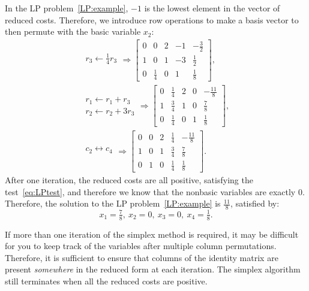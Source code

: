 \begin{example}
In the LP problem~\eqref{LP:example}, $-1$ is the lowest element in the vector of reduced costs. Therefore, we introduce row operations to make a basis vector to then permute with the basic variable $x_2$:
\begin{align*}
\begin{array}{c} r_3\leftarrow \tfrac{1}{4}r_3\\\end{array} \Rightarrow \left[\begin{array}{cccc|c} 0 & 0 & 2 & -1 & -\tfrac{3}{2}\\\hline 1 & 0 & 1 & -3 & \tfrac{1}{2}\\ 0 & \tfrac{1}{4} & 0 & 1 & \tfrac{1}{8}\end{array}\right],\\
\begin{array}{c} r_1\leftarrow r_1+r_3\\r_2\leftarrow r_2+3r_3\end{array} \Rightarrow \left[\begin{array}{cccc|c} 0 & \tfrac{1}{4} & 2 & 0 & -\tfrac{11}{8}\\\hline 1 & \tfrac{3}{4} & 1 & 0 & \tfrac{7}{8}\\ 0 & \tfrac{1}{4} & 0 & 1 & \tfrac{1}{8}\end{array}\right],\\
\begin{array}{c} c_2\leftrightarrow c_4\\\end{array} \Rightarrow \left[\begin{array}{cccc|c} 0 & 0 & 2 & \tfrac{1}{4} & -\tfrac{11}{8}\\\hline 1 & 0 & 1 & \tfrac{3}{4} & \tfrac{7}{8}\\ 0 & 1 & 0 & \tfrac{1}{4} & \tfrac{1}{8}\end{array}\right].
\end{align*}
After one iteration, the reduced costs are all positive, satisfying the test~\eqref{eq:LPtest}, and therefore we know that the nonbasic variables are exactly $0$. Therefore, the solution to the LP problem~\eqref{LP:example} is $\tfrac{11}{8}$, satisfied by:
\[
x_1 = \tfrac{7}{8},~x_2 = 0,~x_3=0,~x_4 = \tfrac{1}{8}.
\]
\end{example}

\begin{remark}
If more than one iteration of the simplex method is required, it may be difficult for you to keep track of the variables after multiple column permutations. Therefore, it is sufficient to ensure that columns of the identity matrix are present {\em somewhere} in the reduced form at each iteration. The simplex algorithm still terminates when all the reduced costs are positive.
\end{remark}

